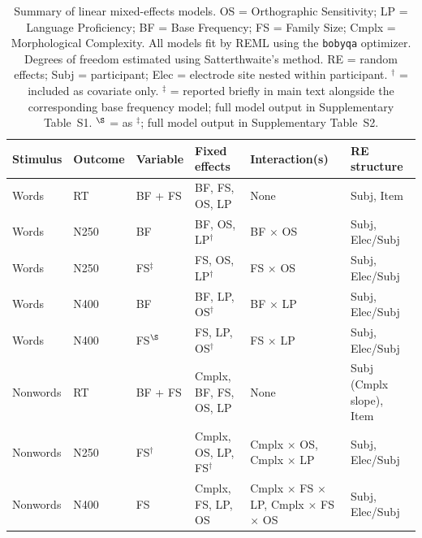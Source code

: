 \documentclass[utf8]{FrontiersinHarvard} %
\begin{document}
	\begin{table}[h!]
		\centering
		\small
		\renewcommand{\arraystretch}{1.4}
		\caption{Summary of linear mixed-effects models. OS = Orthographic Sensitivity; LP = Language Proficiency; BF = Base Frequency; FS = Family Size; Cmplx = Morphological Complexity. All models fit by REML using the \texttt{bobyqa} optimizer. Degrees of freedom estimated using Satterthwaite's method. RE = random effects; Subj = participant; Elec = electrode site nested within participant. $^\dagger$ = included as covariate only. $^\ddagger$ = reported briefly in main text alongside the corresponding base frequency model; full model output in Supplementary Table~S1. $^\S$ = as $^\ddagger$; full model output in Supplementary Table~S2.}
		\label{tab:models}
		\begin{tabular}{p{1.6cm} p{1.2cm} p{1.3cm} p{3.8cm} p{3.2cm} p{2.5cm}}
			\toprule
			\textbf{Stimulus} & \textbf{Outcome} & \textbf{Variable} & 
			\textbf{Fixed effects} & \textbf{Interaction(s)} & 
			\textbf{RE structure} \\
			\midrule
			Words & RT & BF + FS & BF, FS, OS, LP & None & Subj, Item \\
			Words & N250 & BF & BF, OS, LP$^\dagger$ & BF $\times$ OS & Subj, Elec/Subj \\
			Words & N250 & FS$^\ddagger$ & FS, OS, LP$^\dagger$ & FS $\times$ OS & Subj, Elec/Subj \\
			Words & N400 & BF & BF, LP, OS$^\dagger$ & BF $\times$ LP & Subj, Elec/Subj \\
			Words & N400 & FS$^\S$ & FS, LP, OS$^\dagger$ & FS $\times$ LP & Subj, Elec/Subj \\
			Nonwords & RT & BF + FS & Cmplx, BF, FS, OS, LP & None & Subj (Cmplx slope), Item \\
			Nonwords & N250 & FS$^\dagger$ & Cmplx, OS, LP, FS$^\dagger$ & Cmplx $\times$ OS, Cmplx $\times$ LP & Subj, Elec/Subj \\
			Nonwords & N400 & FS & Cmplx, FS, LP, OS & Cmplx $\times$ FS $\times$ LP, Cmplx $\times$ FS $\times$ OS & Subj, Elec/Subj \\
			\bottomrule
		\end{tabular}
	\end{table}
	
\end{document}
